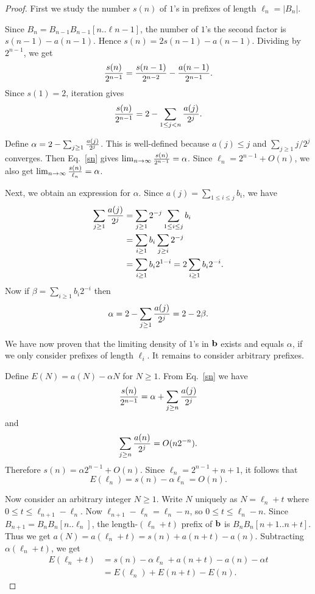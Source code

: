 \documentclass[12pt,reqno]{article}
\begin{document}
\begin{proof}
First we study the number $s(n)$ of $1$'s in prefixes of length
$\ell_n = |B_n|$.

Since $B_n = B_{n-1} B_{n-1}[n..\ell{n-1}]$, the number of $1$'s
the second factor is $s(n-1) - a(n-1)$.
Hence $s(n) = 2s(n-1) - a(n-1)$.  Dividing by $2^{n-1}$, we get
$$ {{s(n)}\over {2^{n-1}}} = {{s(n-1)} \over {2^{n-2}}} - 
{{a(n-1)} \over 2^{n-1}} .$$
Since $s(1) = 2$, iteration gives
\begin{equation}
 {{s(n)} \over {2^{n-1}}} = 2 - \sum_{1 \leq j < n} {{a(j)} \over {2^j}} .
\label{sn}
\end{equation}

Define $\alpha = 2 - \sum_{j \geq 1} {{a(j)} \over {2^j}} $.  This
is well-defined because $a(j) \leq j$ and
$\sum_{j \geq 1} j/2^j$ converges.   Then Eq.~\eqref{sn}
gives $\lim_{n \rightarrow \infty} {{s(n)}\over {2^{n-1}}} = \alpha$.
Since $\ell_n = 2^{n-1} + O(n)$, we also get
$\lim_{n \rightarrow \infty} {{s(n)}\over {\ell_n}} = \alpha$.

Next, we obtain an expression for $\alpha$.
Since $a(j) = \sum_{1 \leq i \leq j} b_i$,
we have
\begin{align*}
\sum_{j \geq 1} {{a(j)} \over {2^j}} &= \sum_{j\geq 1} 2^{-j} \sum_{1 \leq i \leq j} b_i \\
&= \sum_{i \geq 1} b_i \sum_{j \geq i} 2^{-j} \\
&= \sum_{i \geq 1} b_i 2^{1-i}  = 2 \sum_{i \geq 1} b_i 2^{-i}.
\end{align*}
Now if $\beta = \sum_{i \geq 1} b_i 2^{-i}$  then
\begin{equation}
\alpha = 2 - \sum_{j \geq 1} {{a(j)}\over {2^j}} = 2-2 \beta.
\label{alphabeta}
\end{equation}

We have now proven that the limiting density of 
$1$'s in $\bf b$ exists and equals
$\alpha$, if we only consider prefixes of length $\ell_i$.
It remains to consider arbitrary prefixes.

Define $E(N) = a(N) - \alpha N$ for $N \geq 1$.
From Eq.~\eqref{sn} we have
$$ {{s(n)} \over 2^{n-1}} = \alpha + \sum_{j \geq n} {{a(j)} \over
{2^j}} $$
and 
$$ \sum_{j \geq n} {{a(n)} \over {2^j}} = O(n 2^{-n}).$$
Therefore
$s(n) = \alpha 2^{n-1} + O(n)$.
Since $\ell_n = 2^{n-1} + n + 1$, it follows that
$$E(\ell_n) = s(n) - \alpha \ell_n = O(n).$$

Now consider an arbitrary integer $N \geq 1$.  
Write $N$ uniquely as $N = \ell_n + t$ where
$0 \leq t \leq \ell_{n+1} - \ell_n$.
Now
$\ell_{n+1} - \ell_n = \ell_n - n$, so 
$0 \leq t \leq \ell_n - n$.
Since $B_{n+1} = B_n B_n[n..\ell_n]$,
the length-$(\ell_n + t)$ prefix of $\bf b$
is $B_n B_n[n+1..n+t]$.  
Thus we get
$ a(N) = a(\ell_n + t) = s(n) + a(n+t)-a(n)$.
Subtracting $\alpha(\ell_n + t)$, we get
\begin{align}
E(\ell_n + t) &= s(n) - \alpha \ell_n + a(n+t) - a(n) - \alpha t  \nonumber \\
&= E(\ell_n) + E(n+t) - E(n)  \label{ee}.
\end{align}


\end{proof}
\end{document}
